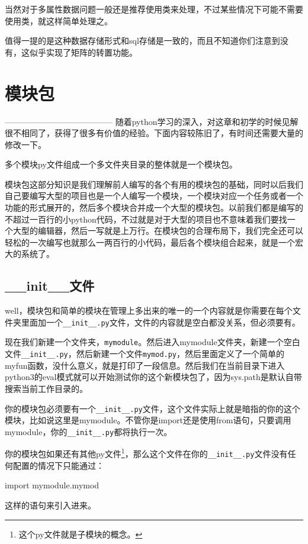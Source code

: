 \documentclass[12pt,oneside]{book}
\begin{document}
\begin{common-format}
当然对于多属性数据问题一般还是推荐使用类来处理，不过某些情况下可能不需要使用类，就这样简单处理之。

值得一提的是这种数据存储形式和sql存储是一致的，而且不知道你们注意到没有，这似乎实现了矩阵的转置功能。







\chapter{模块包}
---------------------------------------
随着python学习的深入，对这章和初学的时候见解很不相同了，获得了很多有价值的经验。下面内容较陈旧了，有时间还需要大量的修改一下。






多个模块py文件组成一个多文件夹目录的整体就是一个模块包。

模块包这部分知识是我们理解前人编写的各个有用的模块包的基础，同时以后我们自己要编写大型的项目也是一个人编写一个模块，一个模块对应一个任务或者一个功能的形式展开的，然后多个模块合并成一个大型的模块包。以前我们都是编写的不超过一百行的小python代码，不过就是对于大型的项目也不意味着我们要找一个大型的编辑器，然后一写就是上万行。在模块包的合理布局下，我们完全还可以轻松的一次编写也就那么一两百行的小代码，最后各个模块组合起来，就是一个宏大的系统了。

\section{\_{}\_{}init\_{}\_{}文件}
well，模块包和简单的模块在管理上多出来的唯一的一个内容就是你需要在每个文件夹里面加一个\verb+__init__.py+文件，文件的内容就是空白都没关系，但必须要有。

现在我们新建一个文件夹，\verb+mymodule+。然后进入mymodule文件夹，新建一个空白文件\verb+__init__.py+，然后新建一个文件\verb+mymod.py+，然后里面定义了一个简单的myfun函数，没什么意义，就是打印了一段信息。然后我们在当前目录下进入python3的eval模式就可以开始测试你的这个新模块包了，因为sys.path是默认自带搜索当前工作目录的。

你的模块包必须要有一个\verb+__init__.py+文件，这个文件实际上就是暗指的你的这个模块，比如说这里是mymodule。不管你是import还是使用from语句，只要调用mymodule，你的\verb+__init__.py+都将执行一次。

你的模块包如果还有其他py文件\footnote{这个py文件就是子模块的概念。}，那么这个文件在你的\verb+__init__.py+文件没有任何配置的情况下只能通过：
\begin{tcbpython}[]
import mymodule.mymod
\end{tcbpython}
这样的语句来引入进来。


\end{common-format}
\end{document}
